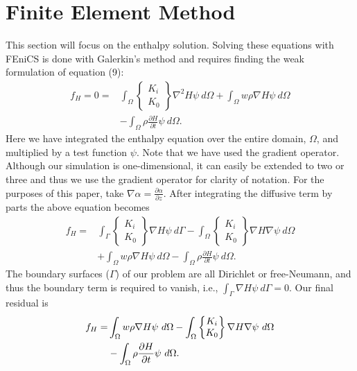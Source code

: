 \documentclass{article}%
\begin{document}
\section{Finite Element Method}

This section will focus on the enthalpy solution.  Solving these equations with FEniCS is done with Galerkin's method and requires finding the weak formulation of equation (9):
\begin{align*}
    f_H = 0 =
    &\int_{\Omega} 
      \begin{Bmatrix}
        K_i\\
        K_0
      \end{Bmatrix}
      \nabla^2 H \psi\ d \Omega 
    + \int_{\Omega}w \rho \nabla H \psi\ d \Omega \\
    &- \int_{\Omega} {\rho \frac{\partial H}{\partial t}} \psi\ d \Omega.
\end{align*}
Here we have integrated the enthalpy equation over the entire domain, $\Omega$, and multiplied by a test function $\psi$.  Note that we have used the gradient operator.  Although our simulation is one-dimensional, it can easily be extended to two or three and thus we use the gradient operator for clarity of notation.  For the purposes of this paper, take $\nabla{\alpha} = \frac{\partial \alpha}{\partial z}$.  After integrating the diffusive term by parts the above equation becomes
\begin{align*}
    f_H =
    & \int_{\Gamma} 
        \begin{Bmatrix}
          K_i\\
          K_0
        \end{Bmatrix}
        \nabla H \psi\ d \Gamma
    - \int_{\Omega} 
        \begin{Bmatrix}
          K_i\\
          K_0
        \end{Bmatrix}
        \nabla H \nabla \psi\ d \Omega \\ 
    &+ \int_{\Omega}w \rho \nabla H \psi\ d \Omega
    - \int_{\Omega} {\rho \frac{\partial H}{\partial t}} \psi\ d \Omega.
\end{align*}
The boundary surfaces ($\Gamma$) of our problem are all Dirichlet or free-Neumann, and thus the boundary term is required to vanish, i.e., $\int_{\Gamma} \nabla H \psi\ d \Gamma = 0$.  Our final residual is
\begin{align}
    f_H =
    &\int_{\Omega}w \rho \nabla H \psi\ d \Omega
    - \int_{\Omega} 
        \begin{Bmatrix}
          K_i\\
          K_0
        \end{Bmatrix}
        \nabla H \nabla \psi\ d \Omega \notag \\ 
    &- \int_{\Omega} {\rho \frac{\partial H}{\partial t}} \psi\ d \Omega.
\end{align}
\end{document}

